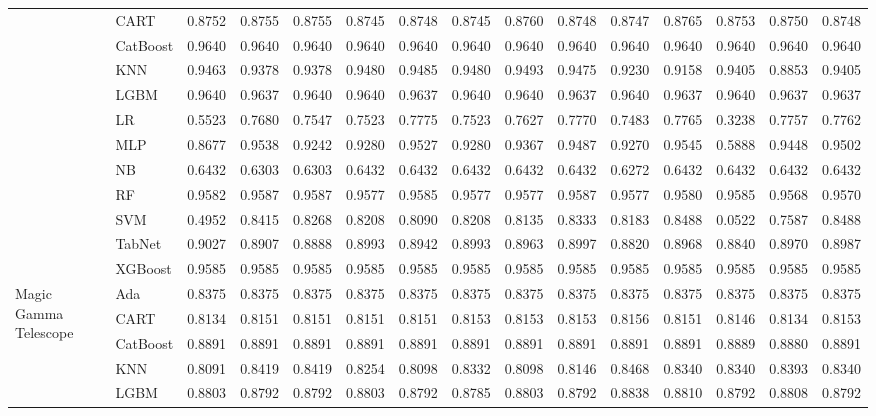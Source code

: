 \begin{table*}[ht]
{\begin{tabular}{llrrrrrrrrrrrrr}
 & CART & 0.8752 & 0.8755 & 0.8755 & 0.8745 & 0.8748 & 0.8745 & 0.8760 & 0.8748 & 0.8747 & 0.8765 & 0.8753 & 0.8750 & 0.8748 \\
 & CatBoost & 0.9640 & 0.9640 & 0.9640 & 0.9640 & 0.9640 & 0.9640 & 0.9640 & 0.9640 & 0.9640 & 0.9640 & 0.9640 & 0.9640 & 0.9640 \\
 & KNN & 0.9463 & 0.9378 & 0.9378 & 0.9480 & 0.9485 & 0.9480 & 0.9493 & 0.9475 & 0.9230 & 0.9158 & 0.9405 & 0.8853 & 0.9405 \\
 & LGBM & 0.9640 & 0.9637 & 0.9640 & 0.9640 & 0.9637 & 0.9640 & 0.9640 & 0.9637 & 0.9640 & 0.9637 & 0.9640 & 0.9637 & 0.9637 \\
 & LR & 0.5523 & 0.7680 & 0.7547 & 0.7523 & 0.7775 & 0.7523 & 0.7627 & 0.7770 & 0.7483 & 0.7765 & 0.3238 & 0.7757 & 0.7762 \\
 & MLP & 0.8677 & 0.9538 & 0.9242 & 0.9280 & 0.9527 & 0.9280 & 0.9367 & 0.9487 & 0.9270 & 0.9545 & 0.5888 & 0.9448 & 0.9502 \\
 & NB & 0.6432 & 0.6303 & 0.6303 & 0.6432 & 0.6432 & 0.6432 & 0.6432 & 0.6432 & 0.6272 & 0.6432 & 0.6432 & 0.6432 & 0.6432 \\
 & RF & 0.9582 & 0.9587 & 0.9587 & 0.9577 & 0.9585 & 0.9577 & 0.9577 & 0.9587 & 0.9577 & 0.9580 & 0.9585 & 0.9568 & 0.9570 \\
 & SVM & 0.4952 & 0.8415 & 0.8268 & 0.8208 & 0.8090 & 0.8208 & 0.8135 & 0.8333 & 0.8183 & 0.8488 & 0.0522 & 0.7587 & 0.8488 \\
 & TabNet & 0.9027 & 0.8907 & 0.8888 & 0.8993 & 0.8942 & 0.8993 & 0.8963 & 0.8997 & 0.8820 & 0.8968 & 0.8840 & 0.8970 & 0.8987 \\
 & XGBoost & 0.9585 & 0.9585 & 0.9585 & 0.9585 & 0.9585 & 0.9585 & 0.9585 & 0.9585 & 0.9585 & 0.9585 & 0.9585 & 0.9585 & 0.9585 \\
\cline{1-15}
\multirow[t]{12}{*}{Magic Gamma Telescope} & Ada & 0.8375 & 0.8375 & 0.8375 & 0.8375 & 0.8375 & 0.8375 & 0.8375 & 0.8375 & 0.8375 & 0.8375 & 0.8375 & 0.8375 & 0.8375 \\
 & CART & 0.8134 & 0.8151 & 0.8151 & 0.8151 & 0.8151 & 0.8153 & 0.8153 & 0.8153 & 0.8156 & 0.8151 & 0.8146 & 0.8134 & 0.8153 \\
 & CatBoost & 0.8891 & 0.8891 & 0.8891 & 0.8891 & 0.8891 & 0.8891 & 0.8891 & 0.8891 & 0.8891 & 0.8891 & 0.8889 & 0.8880 & 0.8891 \\
 & KNN & 0.8091 & 0.8419 & 0.8419 & 0.8254 & 0.8098 & 0.8332 & 0.8098 & 0.8146 & 0.8468 & 0.8340 & 0.8340 & 0.8393 & 0.8340 \\
 & LGBM & 0.8803 & 0.8792 & 0.8792 & 0.8803 & 0.8792 & 0.8785 & 0.8803 & 0.8792 & 0.8838 & 0.8810 & 0.8792 & 0.8808 & 0.8792 \\

\end{tabular}}
\end{table*}
